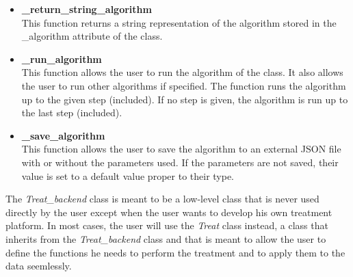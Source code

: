 \begin{itemize}
    \item \textbf{\_return\_string\_algorithm} \\ This function returns a string representation of the algorithm stored in the \_algorithm attribute of the class.
    \item \textbf{\_run\_algorithm} \\ This function allows the user to run the algorithm of the class. It also allows the user to run other algorithms if specified. The function runs the algorithm up to the given step (included). If no step is given, the algorithm is run up to the last step (included). 
    \item \textbf{\_save\_algorithm} \\ This function allows the user to save the algorithm to an external JSON file with or without the parameters used. If the parameters are not saved, their value is set to a default value proper to their type.
\end{itemize}

The \textit{Treat\_backend} class is meant to be a low-level class that is never used directly by the user except when the user wants to develop his own treatment platform. In most cases, the user will use the \textit{Treat} class instead, a class that inherits from the \textit{Treat\_backend} class and that is meant to allow the user to define the functions he needs to perform the treatment and to apply them to the data seemlessly. 
